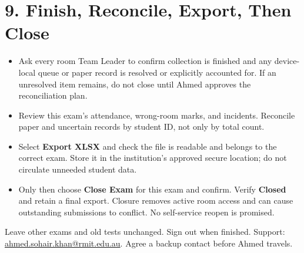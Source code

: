 \documentclass[10pt,a4paper]{article}
\begin{document}
\section*{9. Finish, Reconcile, Export, Then Close}
\begin{itemize}\item[1.] Ask every room Team Leader to confirm collection is finished and any device-local queue or paper record is resolved or explicitly accounted for. If an unresolved item remains, do not close until Ahmed approves the reconciliation plan.\end{itemize}
\begin{itemize}\item[2.] Review this exam's attendance, wrong-room marks, and incidents. Reconcile paper and uncertain records by student ID, not only by total count.\end{itemize}
\begin{itemize}\item[3.] Select \textbf{Export XLSX} and check the file is readable and belongs to the correct exam. Store it in the institution's approved secure location; do not circulate unneeded student data.\end{itemize}
\begin{itemize}\item[4.] Only then choose \textbf{Close Exam} for this exam and confirm. Verify \textbf{Closed} and retain a final export. Closure removes active room access and can cause outstanding submissions to conflict. No self-service reopen is promised.\end{itemize}
Leave other exams and old tests unchanged. Sign out when finished. Support: \href{mailto:ahmed.sohair.khan@rmit.edu.au}{ahmed.sohair.khan@rmit.edu.au}. Agree a backup contact before Ahmed travels.\par
\end{document}

